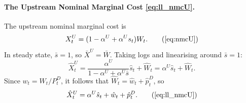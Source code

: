\documentclass[a4paper, 12pt]{article}
\theoremstyle{definition*}
\begin{document}
\paragraph{The Upstream Nominal Marginal Cost \eqref{eq:ll_nmcU}.}
The upstream nominal marginal cost is
\begin{equation}
    X^U_t = (1 - \alpha^U + \alpha^U s_t)W_t. \tag{\ref{eq:nmcU}}
\end{equation}
In steady state, $\bar{s} = 1$, so $\bar{X}^U = \bar{W}$.
Taking logs and linearising around $\bar{s} = 1$:
\begin{equation*}
    \hat{X}^U_t = \frac{\alpha^U}{1 - \alpha^U + \alpha^U \bar{s}}\hat{s}_t + \hat{W}_t = \alpha^U\hat{s}_t + \hat{W}_t.
\end{equation*}
Since $w_t = W_t / P^D_t$, it follows that $\hat{W}_t = \hat{w}_t + \hat{p}^D_t$, so
\begin{equation}
    \hat{X}^U_t = \alpha^U\hat{s}_t + \hat{w}_t + \hat{p}^D_t. \tag{\ref{eq:ll_nmcU}}
\end{equation}
\end{document}
